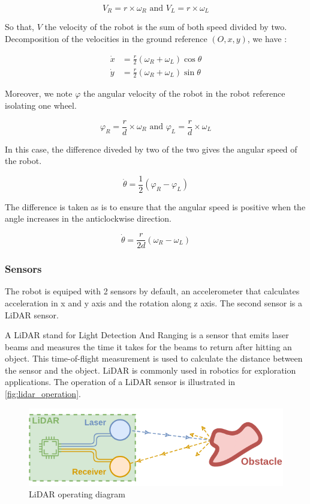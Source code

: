 \documentclass[../main.tex]{subfiles}
\begin{document}
$$\displaystyle V_R = r \times \omega_R \text{     and     } V_L = r \times \omega_L$$

So that, $V$ the velocity of the robot is the sum of both speed divided by two. Decomposition of the velocities in the ground reference $(O, x, y)$, we have :


\begin{align*}
	\displaystyle \dot{x} &= \frac{r}{2} \left(\omega_R + \omega_L\right) \cos \theta\\
	\displaystyle \dot{y} &= \frac{r}{2} \left(\omega_R + \omega_L\right) \sin \theta
\end{align*}


Moreover, we note $\varphi$ the angular velocity of the robot in the robot reference isolating one wheel.


$$\displaystyle \varphi_R = \frac{r}{d} \times \omega_R \text{     and     } \varphi_L =  \frac{r}{d} \times \omega_L$$

In this case, the difference diveded by two of the two gives the angular speed of the robot.

$$\displaystyle \dot{\theta} = \frac{1}{2} \left(\varphi_R - \varphi_L\right)$$

The difference is taken as is to ensure that the angular speed is positive when the angle increases in the anticlockwise direction.

$$\displaystyle \dot{\theta} = \frac{r}{2d} \left(\omega_R - \omega_L\right)$$


\subsubsection{Sensors}

The robot is equiped with 2 sensors by default, an accelerometer that calculates acceleration in x and y axis and the rotation along z axis. The second sensor is a LiDAR sensor.

\vspace{1em}

A LiDAR stand for Light Detection And Ranging is a sensor that emits laser beams and measures the time it takes for the beams to return after hitting an object. This time-of-flight measurement is used to calculate the distance between the sensor and the object. LiDAR is commonly used in robotics for exploration applications. The operation of a LiDAR sensor is illustrated in \autoref{fig:lidar_operation}.

\begin{figure}[H]
	\centering
	\includegraphics[width=0.6\linewidth]{IMAGES/part2/lidar_operation_scheme.png}
	\caption{LiDAR operating diagram}
	\label{fig:lidar_operation}
\end{figure}
\end{document}
